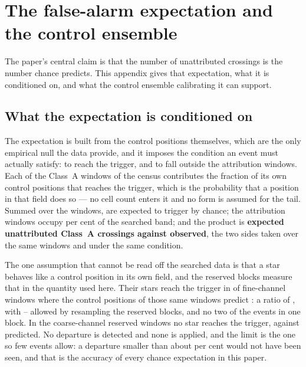 \section{The false-alarm expectation and the control ensemble}
\label{app:falsealarm}

The paper's central claim is that the number of unattributed crossings is the
number chance predicts. This appendix gives that expectation, what it is
conditioned on, and what the control ensemble calibrating it can support.

\subsection{What the expectation is conditioned on}

The expectation is built from the control positions themselves, which are the
only empirical null the data provide, and it imposes the condition an event
must actually satisfy: to reach the trigger, and to fall outside the
attribution windows. Each of the \NWinA{} Class~A windows of the census
contributes the fraction of its own \NCtrl{} control positions that reaches
the trigger, which is the probability that a position in that field does so
--- no cell count enters it and no form is assumed for the tail. Summed over
the windows, \StExpTrig{} are expected to trigger by chance; the attribution
windows occupy \LgMaskOccPct{} per cent of the searched band; and the product
is \textbf{\StExpChance{} expected unattributed Class~A crossings against
\StObs{} observed}, the two sides taken over the same windows and under the
same condition.

The one assumption that cannot be read off the searched data is that a star
behaves like a control position in its own field, and the reserved blocks
measure that in the quantity used here. Their stars reach the trigger in
\StHoObs{} of \StHoNFine{} fine-channel windows where the control positions
of those same windows predict \StHoExpFine: a ratio of \StHoRatio, with
\StHoLo--\StHoHi{} allowed by resampling the reserved blocks, and no two of
the events in one block. In the \StHoNCoarse{} coarse-channel reserved
windows no star reaches the trigger, against \StHoExpCoarse{} predicted. No
departure is detected and none is applied, and the limit is the one so few
events allow: a departure smaller than about \StHoAccPct{} per cent would not
have been seen, and that is the accuracy of every chance expectation in this
paper.

